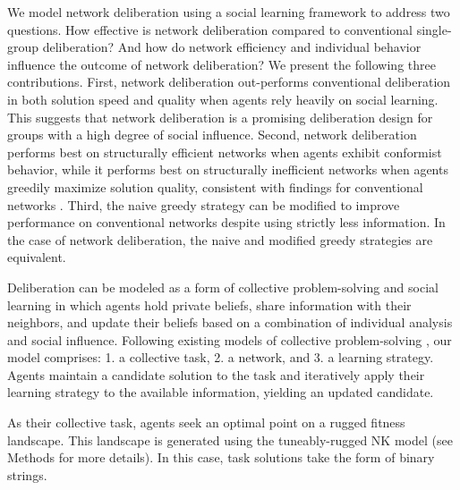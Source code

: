 \documentclass[twocolumn,10pt]{article}
\begin{document}
We model network deliberation using a social learning framework to address two questions. How effective is network deliberation compared to conventional single-group deliberation? And how do network efficiency and individual behavior influence the outcome of network deliberation? We present the following three contributions.
First, network deliberation out-performs conventional deliberation in both solution speed and quality when agents rely heavily on social learning. This suggests that network deliberation is a promising deliberation design for groups with a high degree of social influence. Second, network deliberation performs best on structurally efficient networks when agents exhibit conformist behavior, while it performs best on structurally inefficient networks when agents greedily maximize solution quality, consistent with findings for conventional networks \cite{barkoczi_social_2016}.
Third, the naive greedy strategy can be modified to improve performance on conventional networks despite using strictly less information. In the case of network deliberation, the naive and modified greedy strategies are equivalent.

Deliberation can be modeled as a form of collective problem-solving and social learning in which agents hold private beliefs, share information with their neighbors, and update their beliefs based on a combination of individual analysis and social influence.
Following existing models of collective problem-solving \cite{lazer_network_2007, barkoczi_social_2016, gomez_clustering_2019}, our model comprises: 1. a collective task, 2. a network, and 3. a learning strategy.
Agents maintain a candidate solution to the task and iteratively apply their learning strategy to the available information, yielding an updated candidate.

As their collective task, agents seek an optimal point on a rugged fitness landscape.
This landscape is generated using the tuneably-rugged NK model \cite{kauffman_towards_1987, weinberger_local_1991} (see Methods for more details). In this case, task solutions take the form of binary strings.
\end{document}
